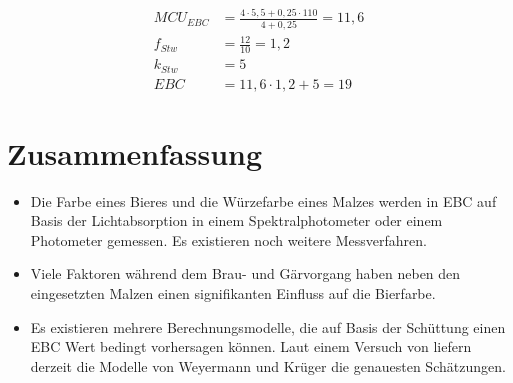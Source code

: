 \documentclass[a4paper,parskip=half]{scrartcl}
\newcommand{\MCUEBC}{\mathit{MCU}_{EBC}}
\newcommand{\EBC}{\mathit{EBC}}
\newcommand{\fstw}{f_{Stw}}
\newcommand{\kstw}{k_{Stw}}
\begin{document}
\begin{align*}
\MCUEBC &= \frac{4 \cdot 5,5 + 0,25 \cdot 110}{4 + 0,25} = 11,6 \\
\fstw &= \frac{12}{10} = 1,2 \\
\kstw &= 5 \\
\EBC &= 11,6 \cdot 1,2 + 5 = 19
\end{align*}

\section*{Zusammenfassung}

\begin{itemize}
\item Die Farbe eines Bieres und die Würzefarbe eines Malzes werden in EBC auf Basis der Lichtabsorption in einem Spektralphotometer oder einem Photometer gemessen. Es existieren noch weitere Messverfahren.
\item Viele Faktoren während dem Brau- und Gärvorgang haben neben den eingesetzten Malzen einen signifikanten Einfluss auf die Bierfarbe.
\item Es existieren mehrere Berechnungsmodelle, die auf Basis der Schüttung einen EBC Wert bedingt vorhersagen können. Laut einem Versuch von \citeauthor{KrausWeyermann2022} liefern derzeit die Modelle von Weyermann und Krüger die genauesten Schätzungen.
\end{itemize}

\printbibliography[title=Quellen]
\end{document}

